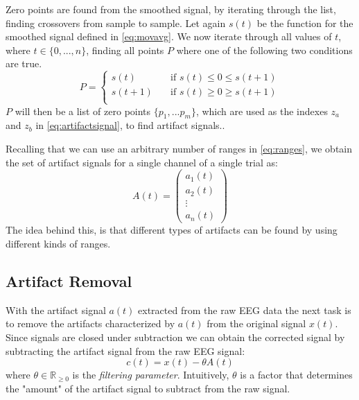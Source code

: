 Zero points are found from the smoothed signal, by iterating through the list, finding crossovers from sample to sample. 
Let again $s(t)$ be the function for the smoothed signal defined in \cref{eq:movavg}. We now iterate through all values of $t$, where $t \in \{0,...,n\}$, finding all points $P$ where one of the following two conditions are true.
\begin{equation}
\label{eq:zero_points}
P =
\begin{cases}
s(t)      & \quad \text{if } s(t) \leq 0 \leq s(t + 1)\\
s(t + 1)  & \quad \text{if } s(t) \geq 0 \geq s(t + 1)\\
\end{cases}
\end{equation}
$P$ will then be a list of zero points $\{p_1,...p_m\}$, which are used as the indexes $z_a$ and $z_b$ in \cref{eq:artifactsignal}, to find artifact signals..

Recalling that we can use an arbitrary number of ranges in \cref{eq:ranges}, we obtain the set of artifact signals for a single channel of a single trial as:
\begin{equation}\label{eq:artifact-signals}
A(t)=  \begin{pmatrix}
a_1(t) \\
a_2(t) \\
\vdots  \\
a_n(t) 
\end{pmatrix}
\end{equation}
The idea behind this, is that different types of artifacts can be found by using different kinds of ranges. 
\subsection{Artifact Removal}
With the artifact signal $a(t)$ extracted from the raw EEG data the next task is to remove the artifacts characterized by $a(t)$ from the original signal $x(t)$. Since signals are closed under subtraction we can obtain the corrected signal by subtracting the artifact signal from the raw EEG signal:
\begin{equation}\label{eq:corrected-signal}
c(t) = x(t) - \theta A(t)
\end{equation}
where $\theta \in \mathbb{R}_{\geq 0}$ is the \emph{filtering parameter}. Intuitively, $\theta$ is a factor that determines the "amount" of the artifact signal to subtract from the raw signal. 

